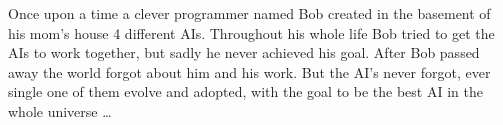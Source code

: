 \clearpage
\thispagestyle{empty}
\vspace*{\fill}
\begin{center}
\begin{minipage}{1.0\textwidth}
Once upon a time a clever programmer named Bob created in the basement of his mom's house 4 different AIs. Throughout his whole life Bob tried to get the AIs to work together, but sadly he never achieved his goal. After Bob passed away the world forgot about him and his work. But the AI's never forgot, ever single one of them evolve and adopted, with the goal to be the best AI in the whole universe \ldots
\end{minipage}
\end{center}
\vfill %
\clearpage

